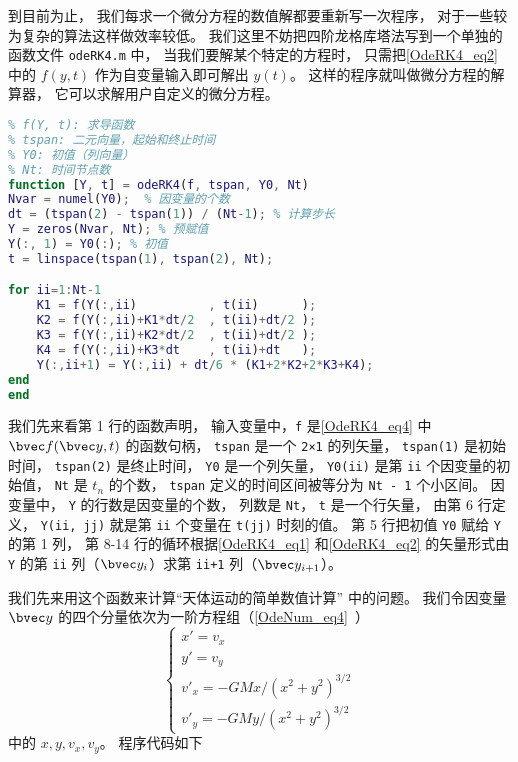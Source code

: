 到目前为止， 我们每求一个微分方程的数值解都要重新写一次程序， 对于一些较为复杂的算法这样做效率较低。 我们这里不妨把四阶龙格库塔法写到一个单独的函数文件 \verb|odeRK4.m| 中， 当我们要解某个特定的方程时， 只需把\autoref{OdeRK4_eq2} 中的 $f(y, t)$ 作为自变量输入即可解出 $y(t)$。 这样的程序就叫做微分方程的解算器， 它可以求解用户自定义的微分方程。

\begin{lstlisting}[language=matlab, caption=odeRK4.m]
% 四阶龙格库塔定步长节微分方程
% f(Y, t): 求导函数
% tspan: 二元向量，起始和终止时间
% Y0: 初值（列向量）
% Nt: 时间节点数
function [Y, t] = odeRK4(f, tspan, Y0, Nt)
Nvar = numel(Y0);  % 因变量的个数
dt = (tspan(2) - tspan(1)) / (Nt-1); % 计算步长
Y = zeros(Nvar, Nt); % 预赋值
Y(:, 1) = Y0(:); % 初值
t = linspace(tspan(1), tspan(2), Nt);

for ii=1:Nt-1
    K1 = f(Y(:,ii)          , t(ii)      );
    K2 = f(Y(:,ii)+K1*dt/2  , t(ii)+dt/2 );
    K3 = f(Y(:,ii)+K2*dt/2  , t(ii)+dt/2 );
    K4 = f(Y(:,ii)+K3*dt    , t(ii)+dt   );
    Y(:,ii+1) = Y(:,ii) + dt/6 * (K1+2*K2+2*K3+K4);
end
end
\end{lstlisting}

我们先来看第 1 行的函数声明， 输入变量中，\verb|f| 是\autoref{OdeRK4_eq4} 中 $\bvec f(\bvec y, t)$ 的函数句柄， \verb|tspan| 是一个 \verb|2×1| 的列矢量， \verb|tspan(1)| 是初始时间， \verb|tspan(2)| 是终止时间， \verb|Y0| 是一个列矢量， \verb|Y0(ii)| 是第 \verb|ii| 个因变量的初始值， \verb|Nt| 是 $t_n$ 的个数， \verb|tspan| 定义的时间区间被等分为 \verb|Nt - 1| 个小区间。 因变量中， \verb|Y| 的行数是因变量的个数， 列数是 \verb|Nt|， \verb|t| 是一个行矢量， 由第 6 行定义， \verb|Y(ii, jj)| 就是第 \verb|ii| 个变量在 \verb|t(jj)| 时刻的值。 第 5 行把初值 \verb|Y0| 赋给 \verb|Y| 的第 1 列， 第 8-14 行的循环根据\autoref{OdeRK4_eq1} 和\autoref{OdeRK4_eq2} 的矢量形式由 \verb|Y| 的第 \verb|ii| 列（$\bvec y_i$）求第 \verb|ii+1| 列（$\bvec y_{i+1}$）。

我们先来用这个函数来计算“天体运动的简单数值计算” 中的问题。 我们令因变量 $\bvec y$ 的四个分量依次为一阶方程组（\autoref{OdeNum_eq4}~）
\begin{equation}\label{OdeRK4_eq5}
\begin{cases}
x' = v_x\\
y' = v_y\\
v'_x = -GMx/(x^2 + y^2)^{3/2}\\
v'_y = -GMy/(x^2 + y^2)^{3/2}
\end{cases}
\end{equation}
中的 $x, y, v_x, v_y$。 程序代码如下

